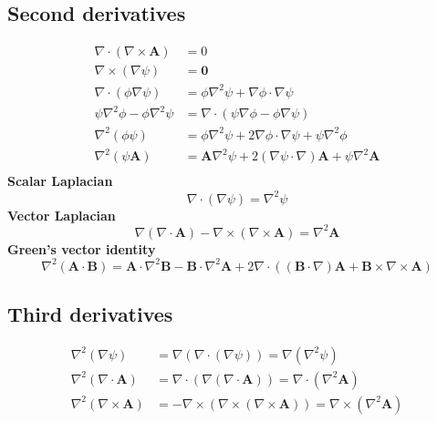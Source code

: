 \documentclass[11pt]{article}
\begin{document}
\begin{multicols}{2}
\subsection*{Second derivatives}

\begin{align*}
 \nabla\cdot(\nabla\times\mathbf{A})&=0 \\
 \nabla\times(\nabla\psi)&= \mathbf{0} \\
 \nabla\cdot(\phi\nabla\psi)&=\phi\nabla^{2}\psi + \nabla\phi\cdot\nabla\psi \\
 \psi\nabla^2\phi-\phi\nabla^2\psi&= \nabla\cdot\left(\psi\nabla\phi-\phi\nabla\psi\right)\\
 \nabla^2(\phi\psi)&=\phi\nabla^2\psi+2\nabla\phi\cdot\nabla\psi+\psi\nabla^2\phi\\
 \nabla^2(\psi\mathbf{A})&=\mathbf{A}\nabla^2\psi+2(\nabla\psi\cdot\nabla)\mathbf{A}+\psi\nabla^2\mathbf{A}\\
\end{align*}
\textbf{Scalar Laplacian}
\[\nabla\cdot(\nabla\psi)=\nabla^{2}\psi \] %
\textbf{Vector Laplacian}
\[\nabla\left(\nabla\cdot\mathbf{A}\right)-\nabla\times\left(\nabla\times\mathbf{A}\right)=\nabla^{2}\mathbf{A} \] %
\textbf{Green's vector identity}
\[\nabla^2(\mathbf{A}\cdot\mathbf{B})= \mathbf{A}\cdot\nabla^2\mathbf{B} - \mathbf{B}\cdot\nabla^2\mathbf{A} + 2\nabla\cdot((\mathbf{B}\cdot\nabla)\mathbf{A} + \mathbf{B}\times\nabla\times\mathbf{A}) \]%

\subsection*{Third derivatives}
\begin{align*}
\nabla^{2}(\nabla\psi) &= \nabla(\nabla\cdot(\nabla\psi)) = \nabla(\nabla^{2}\psi)\\
 \nabla^{2}(\nabla\cdot\mathbf{A}) &= \nabla\cdot(\nabla(\nabla\cdot\mathbf{A})) =\nabla\cdot(\nabla^{2}\mathbf{A})\\
 \nabla^{2}(\nabla\times\mathbf{A}) &= -\nabla\times(\nabla\times(\nabla\times\mathbf{A})) = \nabla\times(\nabla^{2}\mathbf{A})
\end{align*}
\end{multicols}

\newpage
\end{document}
